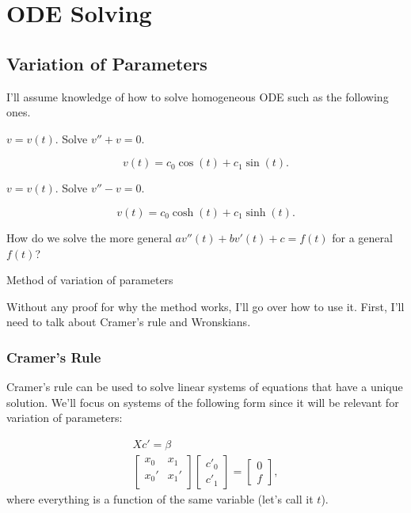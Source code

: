 \chapter{ODE Solving}

\section{Variation of Parameters}

I'll assume knowledge of how to solve homogeneous ODE such as the following ones. 

\begin{quest}
	\item $v = v(t)$. Solve $v'' + v = 0$. 
	\begin{ans}
		\[\boxed{v(t) = c_0 \cos(t) + c_1 \sin(t)}.\]
	\end{ans}

	\item $v = v(t)$. Solve $v'' - v = 0$.
	\begin{ans}
		\[ \boxed{ v(t) = c_0 \cosh(t) + c_1 \sinh(t)  }.\]
	\end{ans}

	\item How do we solve the more general $av''(t) + bv'(t) + c = f(t)$ for a general $f(t)$? 
	\begin{ans}
		Method of variation of parameters
	\end{ans}
\end{quest} 

Without any proof for why the method works, I'll go over how to use it. First, I'll need to talk about Cramer's rule and Wronskians. 

\subsection{Cramer's Rule}

Cramer's rule can be used to solve linear systems of equations that have a unique solution. We'll focus on systems of the following form since it will be relevant for variation of parameters:

\begin{gather*}
	X c' = \beta \\
	\begin{bmatrix}
		x_0 & x_1 \\
		x_0' & x_1' \\
	\end{bmatrix}  \begin{bmatrix}
		c'_0 \\ c'_1 
	\end{bmatrix} = \begin{bmatrix}
		0 \\ f
	\end{bmatrix},
\end{gather*}
where everything is a function of the same variable (let's call it $t$).

